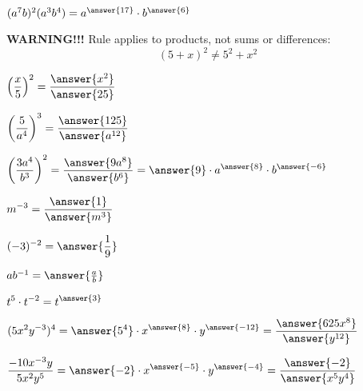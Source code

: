 \documentclass{ximera}
\begin{document}
\begin{problem}
$(a^7 b)^2(a^3 b^4) = a^{\answer{17}}\cdot b^{\answer{6}}$
\end{problem}

{\color{red} {\bf WARNING!!!} Rule applies to products, not sums or differences:
$$ (5 + x)^2 \neq 5^2 + x^2 $$
}

\begin{problem}
$\displaystyle \left(\frac{x}{5} \right )^2 = \frac{\answer{x^2}}{\answer{25}}$
\end{problem}

\begin{problem}
$\displaystyle\left(\frac{5}{a^4} \right )^3 = \frac{\answer{125}}{\answer{a^{12}}}$
\end{problem}

\begin{problem}
$\displaystyle\left(\frac{3a^4}{b^3} \right )^2 = \frac{\answer{9a^8}}{\answer{b^6}}=\answer{9}\cdot a^{\answer{8}}\cdot b^{\answer{-6}}$
\end{problem}

\begin{problem}
$\displaystyle m^{-3}= \frac{\answer{1}}{\answer{m^3}}$
\end{problem}

\begin{problem}
$\displaystyle (-3)^{-2}= \answer{\frac{1}{9}}$
\end{problem}

\begin{problem}
$a b^{-1} = \answer{\frac{a}{b}}$
\end{problem}

\begin{problem}
$\displaystyle t^5 \cdot t^{-2} = t^{\answer{3}}$
\end{problem}

\begin{problem}
$\displaystyle (5x^2y^{-3})^{4}= \answer{5^4}\cdot x^{\answer{8}}\cdot y^{\answer{-12}}=\frac{\answer{625x^8}}{\answer{y^{12}}}$
\end{problem}

\begin{problem}
$\displaystyle \frac{-10 x^{-3}y}{5x^2y^5} = \answer{-2}\cdot x^{\answer{-5}}\cdot y^{\answer{-4}}=\frac{\answer{-2}}{\answer{x^5y^4}}$
\end{problem}
\end{document}
